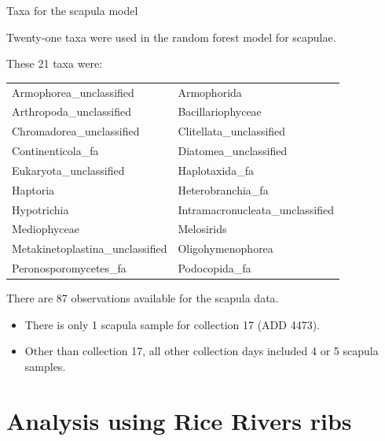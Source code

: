 \documentclass{beamer}
\begin{document}
\begin{frame}{Taxa for the scapula model}

  {\scriptsize
    
  \noindent Twenty-one taxa were used in the random forest model for
  scapulae.
  
  \vspace{0.1in}

  \noindent These 21 taxa were:
  
  \vspace{0.05in}

  \begin{tabular}{ll}
    Armophorea\_unclassified         & Armophorida\\                   
    Arthropoda\_unclassified         & Bacillariophyceae\\              
    Chromadorea\_unclassified        & Clitellata\_unclassified\\        
    Continenticola\_fa               & Diatomea\_unclassified\\         
    Eukaryota\_unclassified          & Haplotaxida\_fa\\         
    Haptoria                         & Heterobranchia\_fa\\              
    Hypotrichia                      & Intramacronucleata\_unclassified\\
    Mediophyceae                     & Melosirids\\                     
    Metakinetoplastina\_unclassified & Oligohymenophorea\\              
    Peronosporomycetes\_fa           & Podocopida\_fa\\             
  \end{tabular}

  \vspace{0.2in}
  \noindent There are 87 observations available for the scapula data.
  \begin{itemize}
    \item There is only 1 scapula sample for collection 17 (ADD 4473).
    \item Other than collection 17, all other collection days included 4 or 5
    scapula samples.
  \end{itemize}
  }

\end{frame}



\section[Ribs]{Analysis using Rice Rivers ribs}
\end{document}
